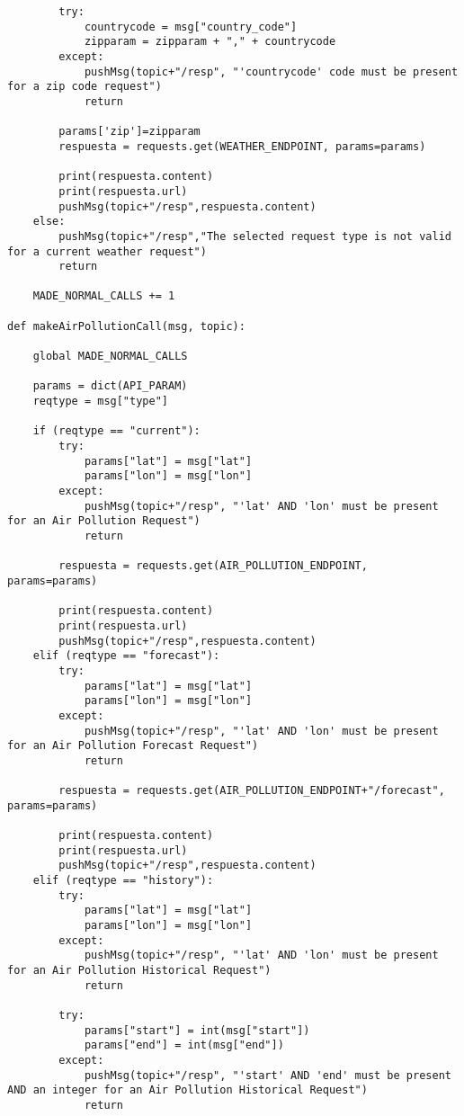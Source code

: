 \documentclass{scrbook}
\begin{document}
{\begin{verbatim}
        try:
            countrycode = msg["country_code"]
            zipparam = zipparam + "," + countrycode
        except:
            pushMsg(topic+"/resp", "'countrycode' code must be present for a zip code request")
            return
            
        params['zip']=zipparam
        respuesta = requests.get(WEATHER_ENDPOINT, params=params)

        print(respuesta.content)
        print(respuesta.url)
        pushMsg(topic+"/resp",respuesta.content)
    else:
        pushMsg(topic+"/resp","The selected request type is not valid for a current weather request")
        return
    
    MADE_NORMAL_CALLS += 1

def makeAirPollutionCall(msg, topic):
    
    global MADE_NORMAL_CALLS
    
    params = dict(API_PARAM)
    reqtype = msg["type"]

    if (reqtype == "current"):
        try:
            params["lat"] = msg["lat"]
            params["lon"] = msg["lon"]
        except:
            pushMsg(topic+"/resp", "'lat' AND 'lon' must be present for an Air Pollution Request")
            return
            
        respuesta = requests.get(AIR_POLLUTION_ENDPOINT, params=params)

        print(respuesta.content)
        print(respuesta.url)
        pushMsg(topic+"/resp",respuesta.content)
    elif (reqtype == "forecast"):
        try:
            params["lat"] = msg["lat"]
            params["lon"] = msg["lon"]
        except:
            pushMsg(topic+"/resp", "'lat' AND 'lon' must be present for an Air Pollution Forecast Request")
            return
            
        respuesta = requests.get(AIR_POLLUTION_ENDPOINT+"/forecast", params=params)

        print(respuesta.content)
        print(respuesta.url)
        pushMsg(topic+"/resp",respuesta.content)
    elif (reqtype == "history"):
        try:
            params["lat"] = msg["lat"]
            params["lon"] = msg["lon"]
        except:
            pushMsg(topic+"/resp", "'lat' AND 'lon' must be present for an Air Pollution Historical Request")
            return
        
        try:
            params["start"] = int(msg["start"])
            params["end"] = int(msg["end"])
        except:
            pushMsg(topic+"/resp", "'start' AND 'end' must be present AND an integer for an Air Pollution Historical Request")
            return
        

\end{verbatim}}
\end{document}
